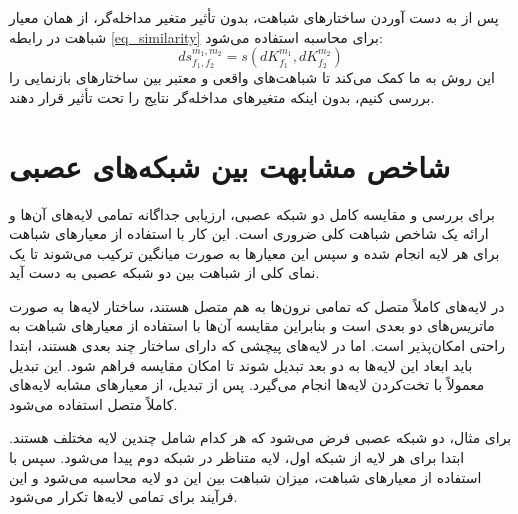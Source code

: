 پس از به دست آوردن ساختارهای شباهت، بدون تأثیر متغیر مداخله‌گر، از همان معیار شباهت در رابطه
\eqref{eq_similarity}
برای محاسبه استفاده می‌شود:
\begin{equation}
	ds^{m_1,m_2}_{f_1,f_2} = s(dK^{m_1}_{f_1}, dK^{m_2}_{f_2})
\end{equation}
این روش به ما کمک می‌کند تا شباهت‌های واقعی و معتبر بین ساختارهای بازنمایی را بررسی کنیم، بدون اینکه متغیرهای مداخله‌گر نتایج را تحت تأثیر قرار دهند.





\section{شاخص مشابهت بین شبکه‌های عصبی}
برای بررسی و مقایسه کامل دو شبکه عصبی، ارزیابی جداگانه تمامی لایه‌های آن‌ها و ارائه یک شاخص شباهت کلی ضروری است. این کار با استفاده از معیارهای شباهت برای هر لایه انجام شده و سپس این معیارها به صورت میانگین ترکیب می‌شوند تا یک نمای کلی از شباهت بین دو شبکه عصبی به دست آید.

در لایه‌های کاملاً متصل%
که تمامی نرون‌ها به هم متصل هستند، ساختار لایه‌ها به صورت ماتریس‌های دو بعدی است و بنابراین مقایسه آن‌ها با استفاده از معیارهای شباهت به راحتی امکان‌پذیر است. اما در لایه‌های پیچشی%
که دارای ساختار چند بعدی هستند، ابتدا باید ابعاد این لایه‌ها به دو بعد تبدیل شوند تا امکان مقایسه فراهم شود. این تبدیل معمولاً با تخت‌کردن%
لایه‌ها انجام می‌گیرد. پس از تبدیل، از معیارهای مشابه لایه‌های کاملاً متصل استفاده می‌شود.

برای مثال، دو شبکه عصبی فرض می‌شود که هر کدام شامل چندین لایه مختلف هستند. ابتدا برای هر لایه از شبکه اول، لایه متناظر در شبکه دوم پیدا می‌شود. سپس با استفاده از معیارهای شباهت، میزان شباهت بین این دو لایه محاسبه می‌شود و این فرآیند برای تمامی لایه‌ها تکرار می‌شود.


